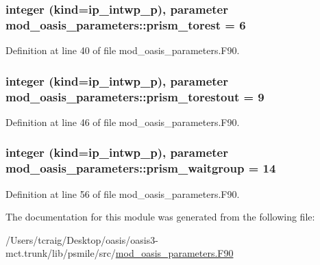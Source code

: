 \hypertarget{classmod__oasis__parameters_a8d037fafc163f46260a8704f92a885a1}{
\subsubsection[{prism\+\_\+torest}]{\setlength{\rightskip}{0pt plus 5cm}integer (kind=ip\+\_\+intwp\+\_\+p), parameter mod\+\_\+oasis\+\_\+parameters\+::prism\+\_\+torest = 6}}\label{classmod__oasis__parameters_a8d037fafc163f46260a8704f92a885a1}


Definition at line 40 of file mod\+\_\+oasis\+\_\+parameters.\+F90.

\hypertarget{classmod__oasis__parameters_a9ed7a0f0a9392248de5b4b15849843df}{
\subsubsection[{prism\+\_\+torestout}]{\setlength{\rightskip}{0pt plus 5cm}integer (kind=ip\+\_\+intwp\+\_\+p), parameter mod\+\_\+oasis\+\_\+parameters\+::prism\+\_\+torestout = 9}}\label{classmod__oasis__parameters_a9ed7a0f0a9392248de5b4b15849843df}


Definition at line 46 of file mod\+\_\+oasis\+\_\+parameters.\+F90.

\hypertarget{classmod__oasis__parameters_ae5cbdfb558e82bfb8695a8cf425780cb}{
\subsubsection[{prism\+\_\+waitgroup}]{\setlength{\rightskip}{0pt plus 5cm}integer (kind=ip\+\_\+intwp\+\_\+p), parameter mod\+\_\+oasis\+\_\+parameters\+::prism\+\_\+waitgroup = 14}}\label{classmod__oasis__parameters_ae5cbdfb558e82bfb8695a8cf425780cb}


Definition at line 56 of file mod\+\_\+oasis\+\_\+parameters.\+F90.



The documentation for this module was generated from the following file\+:\begin{DoxyCompactItemize}
\item 
/\+Users/tcraig/\+Desktop/oasis/oasis3-\/mct.\+trunk/lib/psmile/src/\hyperlink{mod__oasis__parameters_8_f90}{mod\+\_\+oasis\+\_\+parameters.\+F90}\end{DoxyCompactItemize}
